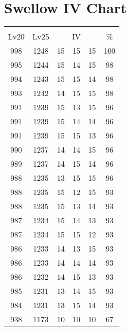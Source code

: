 \documentclass{article}%
\begin{document}
%
\normalsize%
\section{Swellow IV Chart}%
\label{sec:Swellow IV Chart}%
\renewcommand{\arraystretch}{1.5}%
\begin{tabular}{|c|c|c|c|c|c|}%
\hline%
\multicolumn{6}{|c|}{\textcolor{white}{ 
\linebreak{Swellow}
}%
\cellcolor{black}}\\%
\multicolumn{1}{|c}{Lv20}&\multicolumn{1}{c|}{Lv25}&\multicolumn{3}{c|}{IV}&\multicolumn{1}{|c|}{\%}\\%
\hline%
\rowcolor{color100}%
998&1248&15&15&15&100\\%
\hline%
\rowcolor{color98}%
995&1244&15&14&15&98\\%
\hline%
\rowcolor{color98}%
994&1243&15&15&14&98\\%
\hline%
\rowcolor{color98}%
993&1242&14&15&15&98\\%
\hline%
\rowcolor{color96}%
991&1239&15&13&15&96\\%
\hline%
\rowcolor{color96}%
991&1239&15&14&14&96\\%
\hline%
\rowcolor{color96}%
991&1239&15&15&13&96\\%
\hline%
\rowcolor{color96}%
990&1237&14&14&15&96\\%
\hline%
\rowcolor{color96}%
989&1237&14&15&14&96\\%
\hline%
\rowcolor{color96}%
988&1235&13&15&15&96\\%
\hline%
\rowcolor{color93}%
988&1235&15&12&15&93\\%
\hline%
\rowcolor{color93}%
988&1235&15&13&14&93\\%
\hline%
\rowcolor{color93}%
987&1234&15&14&13&93\\%
\hline%
\rowcolor{color93}%
987&1234&15&15&12&93\\%
\hline%
\rowcolor{color93}%
986&1233&14&13&15&93\\%
\hline%
\rowcolor{color93}%
986&1233&14&14&14&93\\%
\hline%
\rowcolor{color93}%
986&1232&14&15&13&93\\%
\hline%
\rowcolor{color93}%
985&1231&13&14&15&93\\%
\hline%
\rowcolor{color93}%
984&1231&13&15&14&93\\%
\hline%
\rowcolor{color91}%
938&1173&10&10&10&67\\%
\end{tabular}

%
\end{document}

